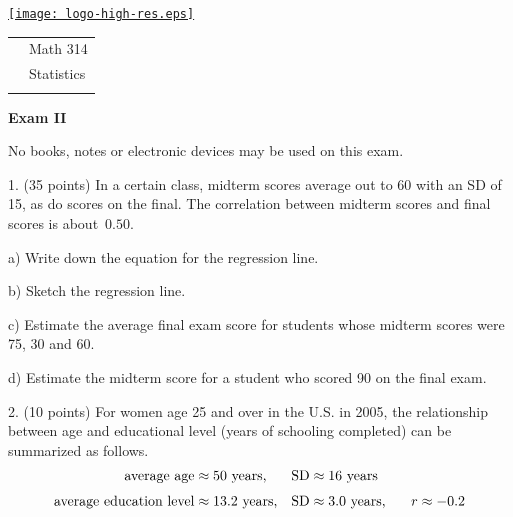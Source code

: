 \documentclass[10pt]{article}
\begin{document}
\pagestyle{empty}
\lstset{language=R, showspaces=false, showstringspaces=false}

\href{http://www.shepherd.edu}{\texttt{[image: logo-high-res.eps]}}
\vspace{-1.69cm}

{\small
\begin{tabular}{cl}
& Math 314\\
& Statistics\\
\hspace{5.28in} & %
\end{tabular}
}
\setlength{\baselineskip}{1.05\baselineskip}

\begin{center}
\textbf{\large  Exam II}
\end{center}
No books, notes or electronic devices may be used on this exam.
\medskip

1. (35 points) In a certain class, midterm scores average out to 60 with an SD of 15, as do 
scores on the final.  The correlation between midterm scores and final scores is 
about~$0.50$.   

\hspace{20pt} a) Write down the equation for the regression line. %
\vspace{1.0in}

\hspace{20pt} b) Sketch the regression line. %
\vspace{1.25in}

\hspace{20pt} c) 
Estimate the average final exam score for students whose midterm scores were
75, 30 and 60. %
\vspace{2.75in}

\hspace{20pt} d) Estimate the midterm score for a student who scored 90 on the final exam.
\vfill
\eject
{\ }


2. (10 points) For women age 25 and over in the U.S. in 2005, the relationship between
age and educational level (years of schooling completed) can be summarized as
follows. 
\begin{align*}
\mbox{average age}         & \approx \mbox{50 years,}    & \mbox{SD} & \approx \mbox{16 years}\\[3pt]
\mbox{average education level}  & \approx \mbox{13.2 years,}  & \mbox{SD} & \approx \mbox{3.0 years,
   \hspace{15pt}} r\approx -0.2
\end{align*}
\end{document}
